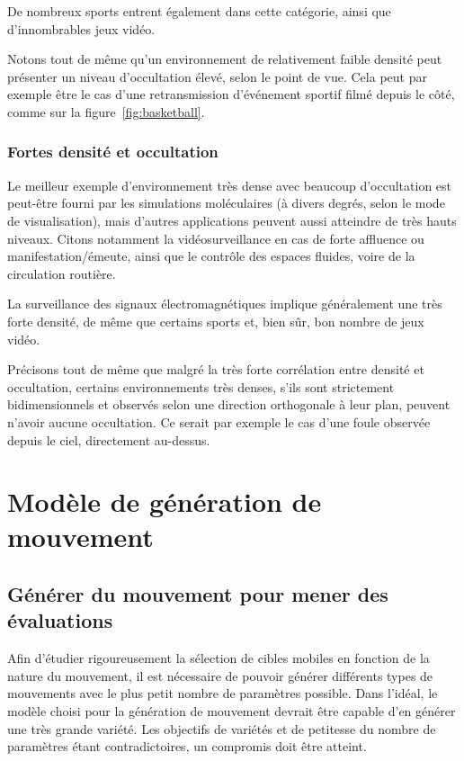 	De nombreux sports entrent également dans cette catégorie, ainsi que d'innombrables jeux vidéo.
	
	Notons tout de même qu'un environnement de relativement faible densité peut présenter un niveau d'occultation élevé, selon le point de vue. Cela peut par exemple être le cas d'une retransmission d'événement sportif filmé depuis le côté, comme sur la figure~\ref{fig:basketball}.
	
	\subsubsection{Fortes densité et occultation}
	Le meilleur exemple d'environnement très dense avec beaucoup d'occultation est peut-être fourni par les simulations moléculaires (à divers degrés, selon le mode de visualisation), mais d'autres applications peuvent aussi atteindre de très hauts niveaux. Citons notamment la vidéosurveillance en cas de forte affluence ou manifestation/émeute, ainsi que le contrôle des espaces fluides, voire de la circulation routière.
	
	La surveillance des signaux électromagnétiques implique généralement une très forte densité, de même que certains sports et, bien sûr, bon nombre de jeux vidéo.
	
	Précisons tout de même que malgré la très forte corrélation entre densité et occultation, certains environnements très denses, s'ils sont strictement bidimensionnels et observés selon une direction orthogonale à leur plan, peuvent n'avoir aucune occultation. Ce serait par exemple le cas d'une foule observée depuis le ciel, directement au-dessus.
	
\section{Modèle de génération de mouvement}
	\subsection{Générer du mouvement pour mener des évaluations}
	Afin d'étudier rigoureusement la sélection de cibles mobiles en fonction de la nature du mouvement, il est nécessaire de pouvoir générer différents types de mouvements avec le plus petit nombre de paramètres possible. Dans l'idéal, le modèle choisi pour la génération de mouvement devrait être capable d'en générer une très grande variété. Les objectifs de variétés et de petitesse du nombre de paramètres étant contradictoires, un compromis doit être atteint.
	
